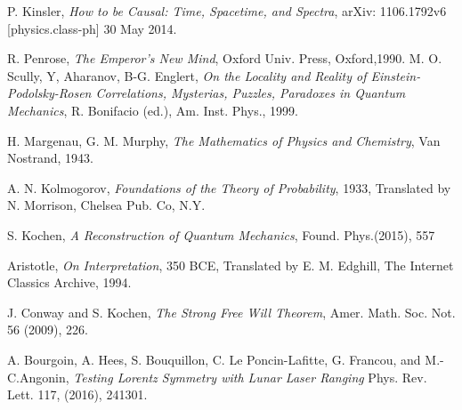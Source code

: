 
                                                                      
                                                                                      \begin{thebibliography}{222}

 P. Kinsler, \emph{How to be Causal: Time, Spacetime, and Spectra}, arXiv: 1106.1792v6 [physics.class-ph] 30 May 2014.

 R. Penrose, \emph{The Emperor's New Mind}, Oxford Univ. Press, Oxford,1990.
  M. O. Scully, Y, Aharanov, B-G. Englert, \emph{On the Locality and Reality of Einstein-Podolsky-Rosen Correlations, Mysterias, Puzzles, Paradoxes in Quantum Mechanics}, R. Bonifacio (ed.), Am. Inst. Phys., 1999.                                                                                                               

  H. Margenau, G. M. Murphy, \emph{The Mathematics of Physics and Chemistry}, Van Nostrand, 1943.                                                                                                                           

 A. N. Kolmogorov, \emph{Foundations of the Theory of Probability}, 1933, Translated by N. Morrison, Chelsea Pub. Co, N.Y.

 S. Kochen, \emph{A Reconstruction of Quantum Mechanics}, Found. Phys.(2015), 557

 Aristotle, \emph{On Interpretation}, 350 BCE, Translated by E. M. Edghill, The Internet Classics Archive, 1994.

 J. Conway and S. Kochen, \emph{The Strong Free Will Theorem}, Amer. Math. Soc. Not. 56 (2009), 226.    

 A. Bourgoin, A. Hees, S. Bouquillon, C. Le Poncin-Lafitte, G. Francou, and M.-C.Angonin, \emph{Testing Lorentz Symmetry with Lunar Laser Ranging} Phys. Rev. Lett. 117, (2016), 241301.


                                                                                                       \end{thebibliography}

